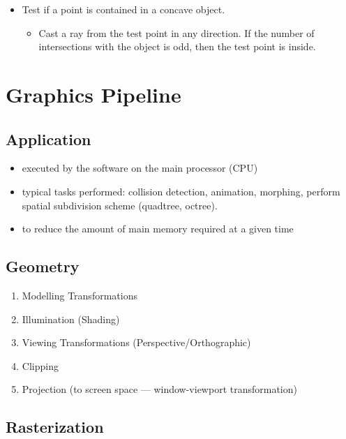 \documentclass[twocolumn,landscape,10pt]{article}
\theoremstyle{definition}
\begin{document}
\begin{itemize}
\begin{itemize}
\begin{enumerate}
                \end{enumerate} 
            \item Test if a point is contained in a concave object.
                \begin{itemize}
                    \item Cast a ray from the test point in any direction. If
                        the number of intersections with the object is odd, then
                        the test point is inside.
                \end{itemize} 
        \end{itemize} 
\end{itemize} 

\section{Graphics Pipeline}

\subsection{Application}

\begin{itemize}
    \item executed by the software on the main processor (CPU)
    \item typical tasks performed: collision detection, animation, morphing,
        perform spatial subdivision scheme (quadtree, octree).
    \item to reduce the amount of main memory required at a given time
\end{itemize} 

\subsection{Geometry}

\begin{enumerate}
    \item Modelling Transformations
    \item Illumination (Shading)
    \item Viewing Transformations (Perspective/Orthographic)
    \item Clipping
    \item Projection (to screen space --- window-viewport transformation)
\end{enumerate} 

\subsection{Rasterization}
\end{document}
